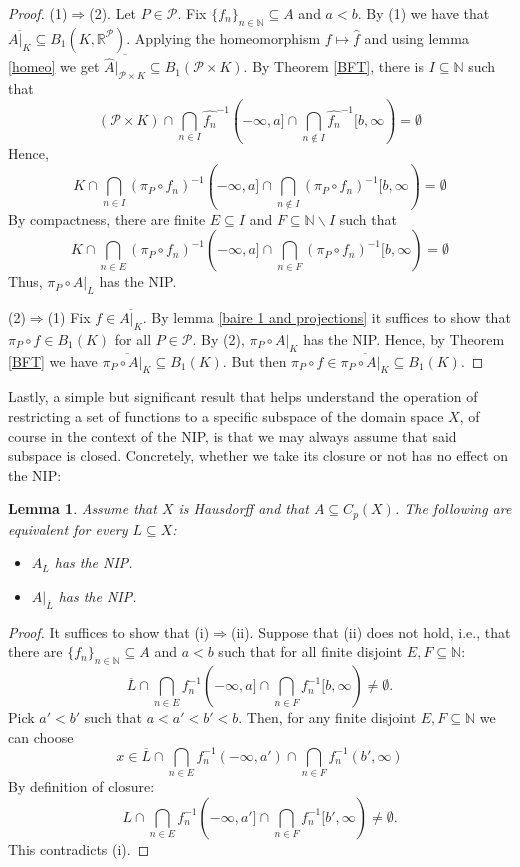 \documentclass[psamsfonts]{amsart}
\newtheorem{lem}[thm]{Lemma}
\theoremstyle{definition}
\theoremstyle{remark}
\numberwithin{equation}{section}
\begin{document}
\begin{proof}
    (1)$\Rightarrow$(2). Let $P\in\mathcal{P}$. Fix $\{f_n\}_{n\in\mathbb N}\subseteq A$ and $a<b$. By (1) we have that $\overline{A|_K}\subseteq B_1(K,\mathbb{R}^\mathcal{P})$. Applying the homeomorphism $f\mapsto \hat{f}$ and using lemma \ref{homeo} we get $\overline{\hat{A}|_{\mathcal{P}\times K}}\subseteq B_1(\mathcal{P}\times K)$. By Theorem \ref{BFT}, there is $I\subseteq\mathbb{N}$ such that
    $$(\mathcal{P}\times K)\cap\bigcap_{n\in I}\hat{f_n}^{-1}(-\infty,a]\cap\bigcap_{n\notin I}\hat{f_n}^{-1}[b,\infty)=\emptyset$$
    Hence,
    $$K\cap\bigcap_{n\in I}(\pi_P\circ f_n)^{-1}(-\infty,a]\cap\bigcap_{n\notin I}(\pi_P\circ f_n)^{-1}[b,\infty)=\emptyset$$
    By compactness, there are finite $E\subseteq I$ and $F\subseteq\mathbb{N}\backslash I$ such that
    $$K\cap\bigcap_{n\in E}(\pi_P\circ f_n)^{-1}(-\infty,a]\cap\bigcap_{n\in F}(\pi_P\circ f_n)^{-1}[b,\infty)=\emptyset$$
    Thus, $\pi_P\circ A|_L$ has the NIP.

    (2)$\Rightarrow$(1) Fix $f\in\overline{A|_K}$. By lemma \ref{baire 1 and projections} it suffices to show that $\pi_P\circ f\in B_1(K)$ for all $P\in\mathcal{P}$. By (2), $\pi_P\circ A|_K$ has the NIP. Hence, by Theorem \ref{BFT} we have $\overline{\pi_P\circ A|_K}\subseteq B_1(K)$. But then $\pi_P\circ f\in\overline{\pi_P\circ A|_K}\subseteq B_1(K)$.
\end{proof}

Lastly, a simple but significant result that helps understand the operation of restricting a set of functions to a specific subspace of the domain space $X$, of course in the context of the NIP, is that we may always assume that said subspace is closed. Concretely, whether we take its closure or not has no effect on the NIP:

\begin{lem}\label{NIP and closure}
    Assume that $X$ is Hausdorff and that $A\subseteq C_p(X)$. The following are equivalent for every $L\subseteq X$:
    \begin{itemize}
        \item [(i)] $A_L$ has the NIP.
        \item [(ii)] $A|_{\overline{L}}$ has the NIP.
    \end{itemize}
\end{lem}

\begin{proof}
    It suffices to show that (i)$\Rightarrow$(ii). Suppose that (ii) does not hold, i.e., that there are $\{f_n\}_{n\in\mathbb N}\subseteq A$ and $a<b$ such that for all finite disjoint $E,F\subseteq\mathbb{N}$:
    $$\overline{L}\cap\bigcap_{n\in E}f_n^{-1}(-\infty,a]\cap\bigcap_{n\in F}f_n^{-1}[b,\infty)\neq\emptyset.$$
    Pick $a'<b'$ such that $a<a'<b'<b$. Then, for any finite disjoint $E,F\subseteq\mathbb{N}$ we can choose
    $$x\in\overline{L}\cap\bigcap_{n\in E}f_n^{-1}(-\infty,a')\cap\bigcap_{n\in F}f_n^{-1}(b',\infty)$$
    By definition of closure:
    $$L\cap\bigcap_{n\in E}f_n^{-1}(-\infty,a']\cap\bigcap_{n\in F}f_n^{-1}[b',\infty)\neq\emptyset.$$
    This contradicts (i).
\end{proof}
\end{document}

